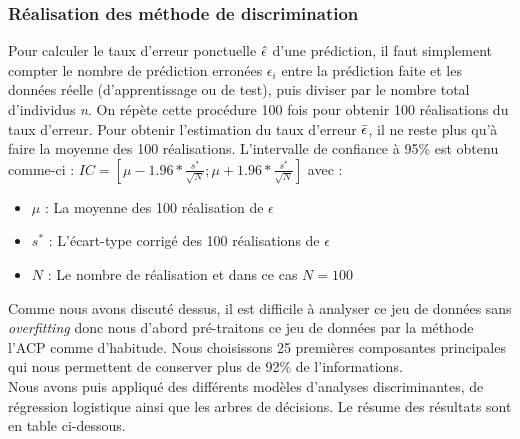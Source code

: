\documentclass[a4paper,11pt,oneside,roman]{article}
\begin{document}
\subsubsection{Réalisation des méthode de discrimination}
Pour calculer le taux d'erreur ponctuelle $\Hat{\epsilon}$ d'une prédiction, il faut simplement compter le nombre de prédiction erronées $\epsilon_i$ entre la prédiction faite et les données réelle (d'apprentissage ou de test), puis diviser par le nombre total d'individus \textit{n}. \newline
On répète cette procédure 100 fois pour obtenir 100 réalisations du taux d'erreur. Pour obtenir l'estimation du taux d'erreur $\Bar{\epsilon}$, il ne reste plus qu'à faire la moyenne des 100 réalisations. \newline
L'intervalle de confiance à 95\% est obtenu comme-ci : $IC = \left[\mu - 1.96*\frac{s^{*}}{\sqrt{N}};\mu + 1.96*\frac{s^{*}}{\sqrt{N}} \right]$ avec : \newline
\begin{itemize}
    \item $\mu$ : La moyenne des 100 réalisation de $\epsilon$ \\
    \item $s^{*}$ : L'écart-type corrigé des 100 réalisations de $\epsilon$ \\
    \item $N$ : Le nombre de réalisation et dans ce cas $N=100$
\end{itemize}
Comme nous avons discuté dessus, il est difficile à analyser ce jeu de données sans \textit{overfitting} donc nous d'abord pré-traitons ce jeu de données par la méthode l'ACP comme d'habitude. Nous choisissons 25 premières composantes principales qui nous permettent de conserver plus de 92\% de l'informations. \\
Nous avons puis appliqué des différents modèles d'analyses discriminantes, de régression logistique ainsi que les arbres de décisions. Le résume des résultats sont en table ci-dessous.
\end{document}
